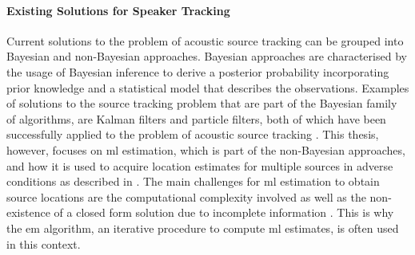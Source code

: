 \paragraph{Existing Solutions for Speaker Tracking}
Current solutions to the problem of acoustic source tracking can be grouped into Bayesian and non-Bayesian approaches. Bayesian approaches are characterised by the usage of Bayesian inference to derive a posterior probability incorporating prior knowledge and a statistical model that describes the observations. Examples of solutions to the source tracking problem that are part of the Bayesian family of algorithms, are Kalman filters \cite{Kalman1960} and particle filters, both of which have been successfully applied to the problem of acoustic source tracking \cite{Gannot2012,Lehmann2007}. This thesis, however, focuses on \gls{ml} estimation, which is part of the non-Bayesian approaches, and how it is used to acquire location estimates for multiple sources in adverse conditions as described in \cite{Schwartz2014}. The main challenges for \gls{ml} estimation to obtain source locations are the computational complexity involved as well as the non-existence of a closed form solution due to incomplete information \cite[p.~1692]{Dorfan2015}. This is why the \gls{em} algorithm, an iterative procedure to compute \gls{ml} estimates, is often used in this context.